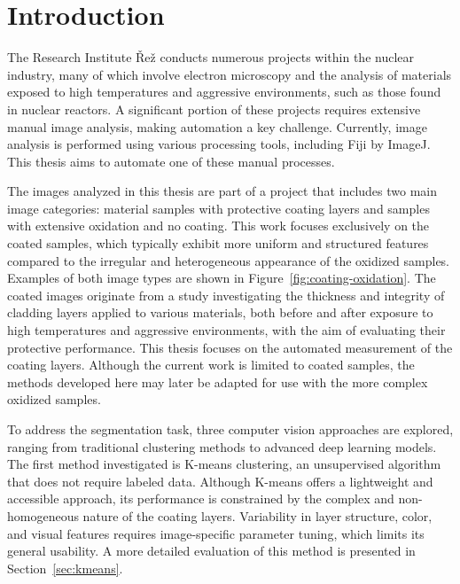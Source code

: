 \chapter{Introduction}

The Research Institute Řež conducts numerous projects within the nuclear industry, many of which involve electron microscopy and the analysis of materials exposed to high temperatures and aggressive environments, such as those found in nuclear reactors. A significant portion of these projects requires extensive manual image analysis, making automation a key challenge. Currently, image analysis is performed using various processing tools, including Fiji \cite{Schindelin2012} by ImageJ. This thesis aims to automate one of these manual processes.

The images analyzed in this thesis are part of a project that includes two main image categories: material samples with protective coating layers and samples with extensive oxidation and no coating. This work focuses exclusively on the coated samples, which typically exhibit more uniform and structured features compared to the irregular and heterogeneous appearance of the oxidized samples. Examples of both image types are shown in Figure~\ref{fig:coating-oxidation}. The coated images originate from a study investigating the thickness and integrity of cladding layers applied to various materials, both before and after exposure to high temperatures and aggressive environments, with the aim of evaluating their protective performance. This thesis focuses on the automated measurement of the coating layers. Although the current work is limited to coated samples, the methods developed here may later be adapted for use with the more complex oxidized samples.


To address the segmentation task, three computer vision approaches are explored, ranging from traditional clustering methods to advanced deep learning models. The first method investigated is K-means clustering, an unsupervised algorithm that does not require labeled data. Although K-means offers a lightweight and accessible approach, its performance is constrained by the complex and non-homogeneous nature of the coating layers. Variability in layer structure, color, and visual features requires image-specific parameter tuning, which limits its general usability. A more detailed evaluation of this method is presented in Section~\ref{sec:kmeans}.



